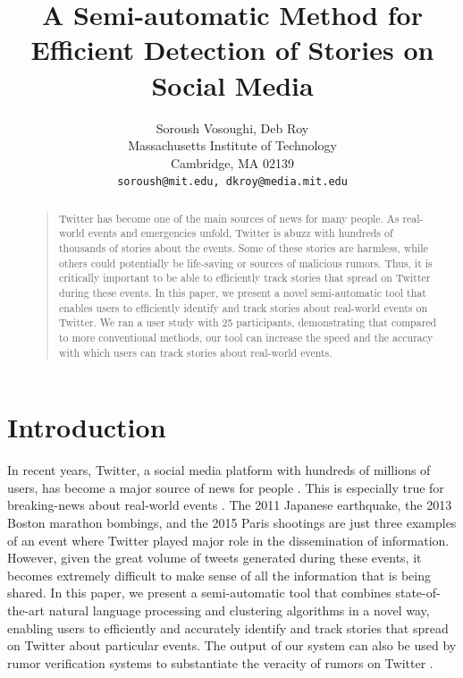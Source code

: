 \documentclass[letterpaper]{article}
\begin{document}
\title{A Semi-automatic Method for Efficient Detection of Stories on Social Media}

\author{Soroush Vosoughi, Deb Roy\\
Massachusetts Institute of Technology\\ Cambridge, MA 02139\\ \tt{soroush@mit.edu, dkroy@media.mit.edu}}




\maketitle
\begin{abstract}
\begin{quote}
Twitter has become one of the main sources of news for many people. As real-world events and emergencies unfold, Twitter is abuzz with hundreds of thousands of stories about the events. Some of these stories are harmless, while others could potentially be life-saving or sources of malicious rumors. Thus, it is critically important to be able to efficiently track stories that spread on Twitter during these events. In this paper, we present a novel semi-automatic tool that enables users to efficiently identify and track stories about real-world events on Twitter. We ran a user study with 25 participants, demonstrating that compared to more conventional methods, our tool can increase the speed and the accuracy with which users can track stories about real-world events.
\end{quote}
\end{abstract}

\setlength{\belowcaptionskip}{-7pt}



\section{Introduction}
In recent years, Twitter, a social media platform with hundreds of millions of users, has become a major source of news for people \cite{stassen2010your}. This is especially true for breaking-news about real-world events \cite{kwak2010twitter}. The 2011 Japanese earthquake, the 2013 Boston marathon bombings, and the 2015 Paris shootings are just three examples of an event where Twitter played major role in the dissemination of information. However, given the great volume of tweets generated during these events, it becomes extremely difficult to make sense of all the information that is being shared. In this paper, we present a semi-automatic tool that combines state-of-the-art natural language processing and clustering algorithms in a novel way, enabling users to efficiently and accurately identify and track stories that spread on Twitter about particular events. The output of our system can also be used by rumor verification systems to substantiate the veracity of rumors on Twitter \cite{vosoughi2015automatic}.
\end{document}
